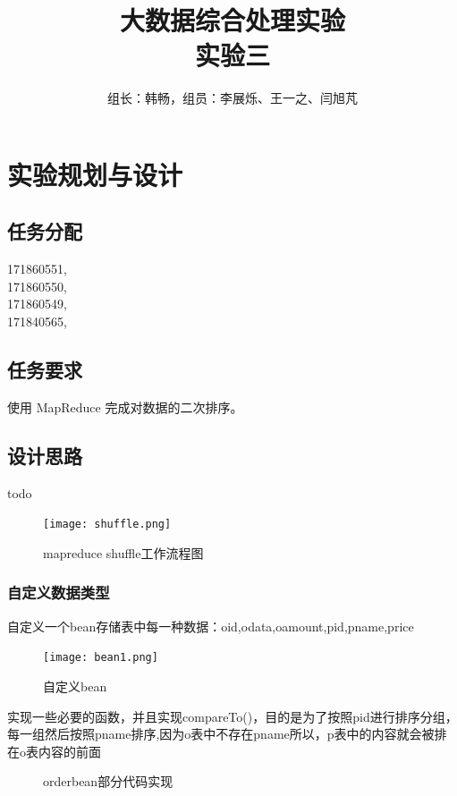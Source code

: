 \documentclass[a4paper,UTF8]{article}
\author{组长：韩畅，组员：李展烁、王一之、闫旭芃}
\numberwithin{equation}{section}
\begin{document}
{}
\title{大数据综合处理实验\\
实验三}
\maketitle

\section{实验规划与设计}
\subsection{任务分配}
{171860551, }\\ \indent
{171860550, }\\ \indent
{171860549, }\\ \indent
{171840565, }
\subsection{任务要求}
使用 MapReduce 完成对数据的二次排序。 
\subsection{设计思路}
todo
\begin{figure}[H]
    \centering

    \texttt{[image: shuffle.png]}

    \caption{mapreduce shuffle工作流程图}
\end{figure}
\subsubsection{自定义数据类型}
自定义一个bean存储表中每一种数据：oid,odata,oamount,pid,pname,price
\begin{figure}[H]
    \centering

    \texttt{[image: bean1.png]}

    \caption{自定义bean}
\end{figure}
实现一些必要的函数，并且实现compareTo()，目的是为了按照pid进行排序分组，每一组然后按照pname排序,因为o表中不存在pname所以，p表中的内容就会被排在o表内容的前面
\begin{figure}[H]
    \centering
    \vfill
    \vfill

    \caption{orderbean部分代码实现}
\end{figure}
\end{document}
